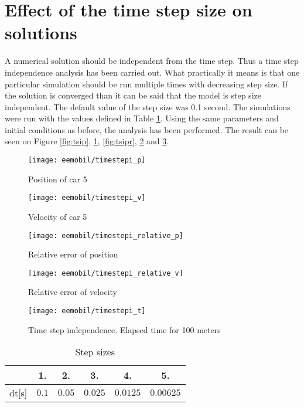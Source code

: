 		\section{Effect of the time step size on solutions}
		A numerical solution should be independent from the time step. Thus a time step independence analysis has been carried out. What practically it means is that one particular simulation should be run multiple times with decreasing step size. If the solution is converged than it can be said that the model is step size independent. The default value of the step size was 0.1 second. The simulations were run with the values defined in Table \ref{tab:timestepsizes}.
		Using the same parameters and initial conditions as before, the analysis has been performed. The result can be seen on Figure \ref{fig:tsip}, \ref{fig:tsiv}, \ref{fig:tsipr}, \ref{fig:tsivr} and \ref{fig:tsit}.
		\begin{figure}
			\centering
			\begin{minipage}{.5\textwidth}
				\centering
				\texttt{[image: eemobil/timestepi\_p]}
				\caption{Position of car 5}
				\label{fig:tsip}
			\end{minipage}\hfill
			\begin{minipage}{.5\textwidth}
				\centering
				\texttt{[image: eemobil/timestepi\_v]}
				\caption{Velocity of car 5}
				\label{fig:tsiv}
			\end{minipage}
		\end{figure}
		\begin{figure}
			\centering
			\begin{minipage}{.5\textwidth}
				\centering
				\texttt{[image: eemobil/timestepi\_relative\_p]}
				\caption{Relative error of position}
				\label{fig:tsipr}
			\end{minipage}\hfill
			\begin{minipage}{.5\textwidth}
				\centering
				\texttt{[image: eemobil/timestepi\_relative\_v]}
				\caption{Relative error of velocity}
				\label{fig:tsivr}
			\end{minipage}
		\end{figure}
		\begin{figure}
			\centering
			\texttt{[image: eemobil/timestepi\_t]}
			\caption{Time step independence. Elapsed time for 100 meters}
			\label{fig:tsit}
		\end{figure}
		\begin{table}
			\begin{center}
				\begin{tabular}{ |c||c|c|c|c|c| }
					\hline
					&1. & 2. & 3. & 4. & 5.\\
					\hline
					dt[s]& $0.1$ & $0.05$ & $0.025$ & $0.0125$ & $0.00625$ \\
					\hline
				\end{tabular}
			\end{center}
			\caption{Step sizes}
			\label{tab:timestepsizes}
		\end{table}
